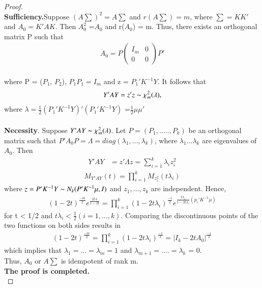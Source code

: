 \documentclass[journal,12pt,twocolumn]{IEEEtran}
\begin{document}
\begin{proof}
\\ \textbf{Sufficiency.}Suppose $(A\sum)^2=A\sum$ and $r(A \textstyle\sum)=m$, where $\sum= KK'$
and $A_0= K'AK$. Then $A_0^2$ =$A_0$ and r($A_0$) = m. Thus, there exists an orthogonal
matrix P such that\\
\begin{align}
    A_0=P\begin{pmatrix}I_m & 0\\ 0 & 0 \end{pmatrix}P'
\end{align}
\\where P = ($P_1$, $P_2$), $P_1P_1 = I_m$ and z = $P_1'K^{-1}Y$. It follows that\\
\begin{align}
Y'AY = z'z \thicksim \chi_m^2(\lambda),
\end{align}
where $\lambda =\frac{1}{2}(P_1'K^{-1}Y)'(P_1'K^{-1}Y)$ =$\frac{1}{2}\mu\mu'$\\
\\\textbf{Necessity}. Suppose $Y'AY \thicksim \chi_m^2(\lambda)$. Let $P = (P_1,....., P_k)$ be an orthogonal
matrix such that $P'A_0P =\Lambda = diag(\lambda_1,..., \lambda_k)$, where $\lambda_1 $\geq$ ... $\geq$\lambda_k$ are eigenvalues of $A_0$. Then\\
\begin{align}
Y'AY &=z'\Lambda z =\sum_{i=1}^{k} \lambda_i z_i^2 
\end{align}
\begin{align} M_{Y'AY}(t)=\prod\limits_{i=1}^{k}M_{z_i^2}(t\lambda_i)
\end{align}
where $z = P'K^{-1}Y \thicksim N_k(P'K^{-1}\mu ,I)$ and  $z_1, ..., z_k$ are independent. Hence,\\
\begin{align}
(1-2t)^{\frac{-m}{2}}e^{\frac{2t\lambda}{1-2t}}=\prod\limits_{i=1}^{k}(1-2t\lambda_i)^{\frac{-1}{2}}e^{\frac{t\lambda_i}{1-2t\lambda_i}(p_i'K^{-1}\mu)}
\end{align}
for t < 1/2 and $t \lambda_i <\frac{1}{2} (i = 1, ..., k)$. Comparing the discontinuous points of
the two functions on both sides results in\\
\begin{align}
    (1-2t)^{\frac{-m}{2}}=\prod\limits_{i=1}^{k}(1-2t\lambda_i)^{\frac{-1}{2}}=|I_k-2t A_0|^{\frac{-1}{2}}
\end{align}
which implies that $\lambda_1 = ... = \lambda_m = 1$ and $\lambda_{m+1}= ....=\lambda_{k}$ = 0.\\
Thus, $A_0$ or $A\sum$ is idempotent of rank m.\\
\textbf{The proof is completed.}\\
\end{proof}
\end{document}
